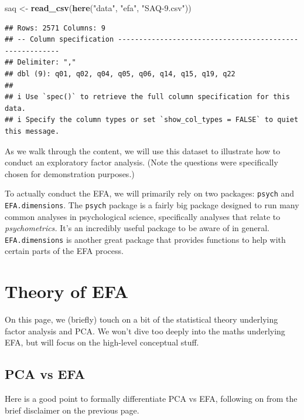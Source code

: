 \documentclass[
]{book}
\newenvironment{Shaded}{\begin{snugshade}}{\end{snugshade}}
\newcommand{\FunctionTok}[1]{\textcolor[rgb]{0.13,0.29,0.53}{\textbf{#1}}}
\newcommand{\NormalTok}[1]{#1}
\newcommand{\OtherTok}[1]{\textcolor[rgb]{0.56,0.35,0.01}{#1}}
\newcommand{\StringTok}[1]{\textcolor[rgb]{0.31,0.60,0.02}{#1}}
\begin{document}
\begin{Shaded}
\begin{Highlighting}[]
\NormalTok{saq }\OtherTok{\textless{}{-}} \FunctionTok{read\_csv}\NormalTok{(}\FunctionTok{here}\NormalTok{(}\StringTok{"data"}\NormalTok{, }\StringTok{"efa"}\NormalTok{, }\StringTok{"SAQ{-}9.csv"}\NormalTok{))}
\end{Highlighting}
\end{Shaded}

\begin{verbatim}
## Rows: 2571 Columns: 9
## -- Column specification --------------------------------------------------------
## Delimiter: ","
## dbl (9): q01, q02, q04, q05, q06, q14, q15, q19, q22
## 
## i Use `spec()` to retrieve the full column specification for this data.
## i Specify the column types or set `show_col_types = FALSE` to quiet this message.
\end{verbatim}

As we walk through the content, we will use this dataset to illustrate how to conduct an exploratory factor analysis. (Note the questions were specifically chosen for demonstration purposes.)

To actually conduct the EFA, we will primarily rely on two packages: \texttt{psych} and \texttt{EFA.dimensions}. The \texttt{psych} package is a fairly big package designed to run many common analyses in psychological science, specifically analyses that relate to \emph{psychometrics.} It's an incredibly useful package to be aware of in general. \texttt{EFA.dimensions} is another great package that provides functions to help with certain parts of the EFA process.

\section{Theory of EFA}\label{theory-of-efa}

On this page, we (briefly) touch on a bit of the statistical theory underlying factor analysis and PCA. We won't dive too deeply into the maths underlying EFA, but will focus on the high-level conceptual stuff.

\subsection{PCA vs EFA}\label{pca-vs-efa}

Here is a good point to formally differentiate PCA vs EFA, following on from the brief disclaimer on the previous page.
\end{document}

